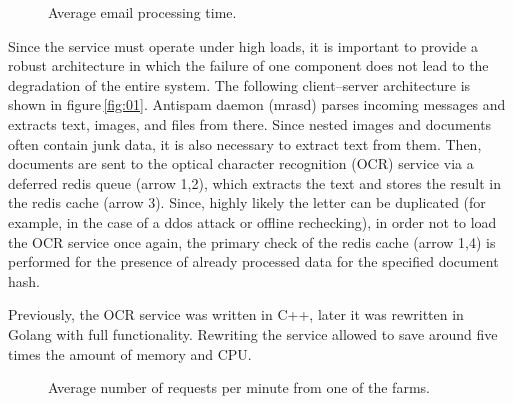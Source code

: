 \documentclass[a4paper]{jpconf}
\begin{document}
\begin{figure}[b]
\centering
{}
\caption{\label{fig:02} Average email processing time.}
\end{figure}

Since the service must operate under high loads, it is important to provide a robust architecture in which the failure of one component does not lead to the degradation of the entire system. The following client--server architecture is shown in figure\,\ref{fig:01}. Antispam daemon (mrasd) parses incoming messages and extracts text, images, and files from there. Since nested images and documents often contain junk data, it is also necessary to extract text from them. Then, documents are sent to the optical character recognition (OCR) service via a deferred redis queue (arrow 1,2), which extracts the text and stores the result in the redis cache (arrow 3).
Since, highly likely the letter can be duplicated (for example, in the case of a ddos attack or offline rechecking), in order not to load the OCR service once again, the primary check of the redis cache (arrow 1,4) is performed for the presence of already processed data for the specified document hash.

Previously, the OCR service was written in C++, later it was rewritten in Golang with full functionality. Rewriting the service allowed to save around five times the amount of memory and CPU.
 
\begin{figure}[t!]
\centering
{}
\caption{\label{fig:03} Average number of requests per minute from one of the farms.}
\end{figure}
\end{document}
